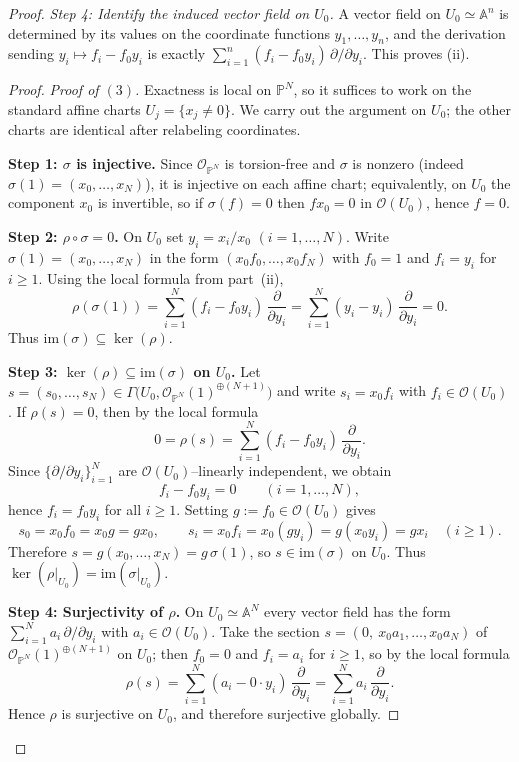 \documentclass[11pt]{article}
\theoremstyle{plain}
\newcommand{\PP}{\mathbb{P}}
\newcommand{\OO}{\mathcal{O}}
\begin{document}
\begin{proof}
\smallskip
\noindent\emph{Step 4: Identify the induced vector field on $U_0$.}
A vector field on $U_0\simeq \mathbb{A}^n$ is determined by its values on the coordinate
functions $y_1,\dots,y_n$, and the derivation sending $y_i\mapsto f_i-f_0 y_i$
is exactly $\sum_{i=1}^n (f_i-f_0 y_i)\,\partial/\partial y_i$. This proves (ii). \\

\begin{proof}
\noindent \textit{Proof of $(3)$.}
Exactness is local on $\PP^N$, so it suffices to work on the standard affine charts
$U_j=\{x_j\neq 0\}$.  We carry out the argument on $U_0$; the other charts are identical
after relabeling coordinates.

\medskip
\noindent\textbf{Step 1: $\sigma$ is injective.}
Since $\OO_{\PP^N}$ is torsion-free and $\sigma$ is nonzero (indeed $\sigma(1)=(x_0,\dots,x_N)$),
it is injective on each affine chart; equivalently, on $U_0$ the component $x_0$ is
invertible, so if $\sigma(f)=0$ then $f x_0=0$ in $\OO(U_0)$, hence $f=0$.

\medskip
\noindent\textbf{Step 2: $\rho\circ\sigma=0$.}
On $U_0$ set $y_i=x_i/x_0$ $(i=1,\dots,N)$.  Write $\sigma(1)=(x_0,\dots,x_N)$ in the
form $(x_0 f_0,\dots,x_0 f_N)$ with $f_0=1$ and $f_i=y_i$ for $i\ge 1$.  Using the local
formula from part~(ii),
\[
\rho(\sigma(1))
=
\sum_{i=1}^N (f_i-f_0 y_i)\,\frac{\partial}{\partial y_i}
=
\sum_{i=1}^N (y_i-y_i)\,\frac{\partial}{\partial y_i}
=0.
\]
Thus $\mathrm{im}(\sigma)\subseteq \ker(\rho)$.

\medskip
\noindent\textbf{Step 3: $\ker(\rho)\subseteq \mathrm{im}(\sigma)$ on $U_0$.}
Let $s=(s_0,\dots,s_N)\in \Gamma\!\big(U_0,\OO_{\PP^N}(1)^{\oplus(N+1)}\big)$ and write
$s_i=x_0 f_i$ with $f_i\in \OO(U_0)$.  If $\rho(s)=0$, then by the local formula
\[
0=\rho(s)=\sum_{i=1}^N (f_i-f_0 y_i)\,\frac{\partial}{\partial y_i}.
\]
Since $\{\partial/\partial y_i\}_{i=1}^N$ are $\OO(U_0)$--linearly independent, we obtain
\[
f_i-f_0 y_i=0 \qquad (i=1,\dots,N),
\]
hence $f_i=f_0 y_i$ for all $i\ge 1$.  Setting $g:=f_0\in \OO(U_0)$ gives
\[
s_0=x_0 f_0=x_0 g=g x_0,
\qquad
s_i=x_0 f_i=x_0(g y_i)=g(x_0 y_i)=g x_i \quad (i\ge 1).
\]
Therefore $s=g(x_0,\dots,x_N)=g\,\sigma(1)$, so $s\in \mathrm{im}(\sigma)$ on $U_0$.
Thus $\ker(\rho|_{U_0})=\mathrm{im}(\sigma|_{U_0})$.

\medskip
\noindent\textbf{Step 4: Surjectivity of $\rho$.}
On $U_0\simeq \mathbb{A}^N$ every vector field has the form
$\sum_{i=1}^N a_i\,\partial/\partial y_i$ with $a_i\in \OO(U_0)$.  Take the section
$s=(0,\ x_0 a_1,\dots,x_0 a_N)$ of $\OO_{\PP^N}(1)^{\oplus(N+1)}$ on $U_0$; then $f_0=0$
and $f_i=a_i$ for $i\ge 1$, so by the local formula
\[
\rho(s)=\sum_{i=1}^N (a_i-0\cdot y_i)\,\frac{\partial}{\partial y_i}
=\sum_{i=1}^N a_i\,\frac{\partial}{\partial y_i}.
\]
Hence $\rho$ is surjective on $U_0$, and therefore surjective globally.


\end{proof}
\end{proof}
\end{document}
